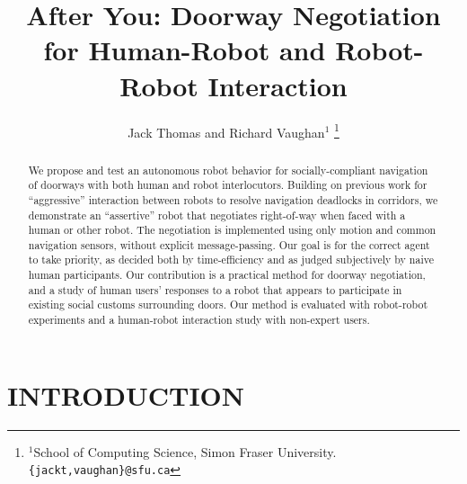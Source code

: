 \documentclass[letterpaper, 10 pt, conference]{ieeeconf}  %
\title{\LARGE \bf
After You: Doorway Negotiation for Human-Robot and Robot-Robot Interaction
}
\author{Jack Thomas and Richard Vaughan$^{1}$%
\thanks{$^{1}$School of Computing Science, Simon Fraser University.
        {\tt\small \{jackt,vaughan\}@sfu.ca}}%
}
\begin{document}
\maketitle
\thispagestyle{empty}
\pagestyle{empty}


\begin{abstract}

We propose and test an autonomous robot behavior for socially-compliant navigation of doorways with both human and robot interlocutors. Building on previous work for ``aggressive'' interaction between robots to resolve navigation deadlocks in corridors, we demonstrate an ``assertive'' robot that negotiates right-of-way when faced with a human or other robot. The negotiation is implemented using only motion and common navigation sensors, without explicit message-passing. Our goal is for the correct agent to take priority, as decided both by time-efficiency and as judged subjectively by naive human participants. Our contribution is a practical method for doorway negotiation, and a study of human users' responses to a robot that appears to participate in existing social customs surrounding doors. Our method is evaluated with robot-robot experiments and a human-robot interaction study with non-expert users.

\end{abstract}


\section{INTRODUCTION}


\end{document}
